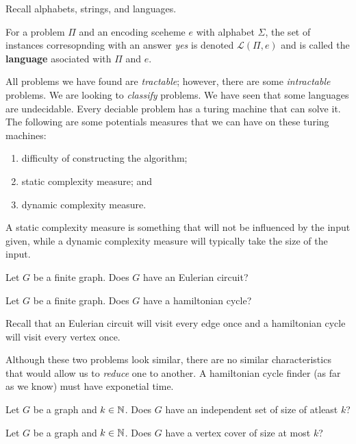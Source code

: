 Recall alphabets, strings, and languages.

For a problem $\Pi$ and an encoding sceheme $e$ with alphabet $\Sigma$,
the set of instances corresopnding with an answer \emph{yes} is denoted
$\mathcal L(\Pi, e)$
and is called the \textbf{language} asociated with $\Pi$ and $e$.

All problems we have found are \emph{tractable}; however,
there are some \emph{intractable} problems.
We are looking to \emph{classify} problems. We have seen that some languages are undecidable.
Every deciable problem has a turing machine that can solve it.
The following are some potentials measures that we can have on
these turing machines:
\begin{enumerate}
    \item difficulty of constructing the algorithm;
    \item static complexity measure; and
    \item dynamic complexity measure.
\end{enumerate}
A static complexity measure is something that will not be influenced
by the input given,
while a dynamic complexity measure will typically take the size of the
input.

\begin{problem}
    Let $G$ be a finite graph. Does $G$ have an Eulerian circuit?
\end{problem}

\begin{problem}
    Let $G$ be a finite graph. Does $G$ have a hamiltonian cycle?
\end{problem}

\begin{remark}
    Recall that an Eulerian circuit will visit every edge once
    and a hamiltonian cycle will visit every vertex once.
\end{remark}

Although these two problems look similar, there are no
similar characteristics that would allow us to \emph{reduce}
one to another. 
A hamiltonian cycle finder (as far as we know) must have exponetial time.

\begin{problem}
    Let $G$ be a graph and $k \in \mathbb{N}$.
    Does $G$ have an independent set of size of atleast $k$?
\end{problem}

\begin{problem}
    Let $G$ be a graph and $k \in \mathbb{N}$.
    Does $G$ have a vertex cover of size at most $k$?
\end{problem}

